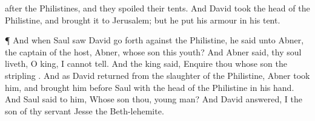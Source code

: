 {after the
Philistines, and they
spoiled their
tents.
And
David
took the
head of the
Philistine, and
brought it to
Jerusalem; but he
put his
armour in his
tent.
\par }{\PP {}¶ And when
Saul
saw
David go
forth
against the
Philistine, he
said unto
Abner, the
captain of the
host,
Abner, whose
son
{} this
youth? And
Abner
said,
{} thy
soul
liveth, O
king, I
cannot
tell.
And the
king
said,
Enquire thou whose
son the
stripling
{}.
And as
David
returned from the
slaughter of the
Philistine,
Abner
took him, and
brought him
before
Saul with the
head of the
Philistine in his
hand.
And
Saul
said to him, Whose
son
{} thou,
{} young
man? And
David
answered, I
{} the
son of thy
servant
Jesse the
Beth-lehemite.

}
